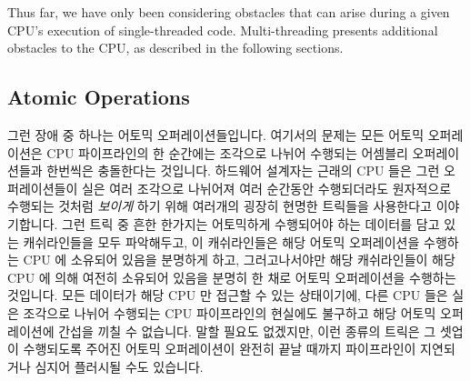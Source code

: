 Thus far, we have only been considering obstacles that can arise during
a given CPU's execution of single-threaded code.
Multi-threading presents additional obstacles to the CPU, as
described in the following sections.
\fi

\subsection{Atomic Operations}
\label{sec:cpu:Atomic Operations}

그런 장애 중 하나는 어토믹 오퍼레이션들입니다.
여기서의 문제는 모든 어토믹 오퍼레이션은 CPU 파이프라인의 한 순간에는 조각으로
나뉘어 수행되는 어셈블리 오퍼레이션들과 한번씩은 충돌한다는 것입니다.
하드웨어 설계자는 근래의 CPU 들은 그런 오퍼레이션들이 실은 여러 조각으로
나뉘어져 여러 순간동안 수행되더라도 원자적으로 수행되는 것처럼 \emph{보이게}
하기 위해 여러개의 굉장히 현명한 트릭들을 사용한다고 이야기합니다. 그런 트릭 중
흔한 한가지는 어토믹하게 수행되어야 하는 데이터를 담고 있는 캐쉬라인들을 모두
파악해두고, 이 캐쉬라인들은 해당 어토믹 오퍼레이션을 수행하는 CPU 에 소유되어
있음을 분명하게 하고, 그러고나서야만 해당 캐쉬라인들이 해당 CPU 에 의해 여전히
소유되어 있음을 분명히 한 채로 어토믹 오퍼레이션을 수행하는 것입니다.
모든 데이터가 해당 CPU 만 접근할 수 있는 상태이기에, 다른 CPU 들은 실은
조각으로 나뉘어 수행되는 CPU 파이프라인의 현실에도 불구하고 해당 어토믹
오퍼레이션에 간섭을 끼칠 수 없습니다.
말할 필요도 없겠지만, 이런 종류의 트릭은 그 셋업이 수행되도록 주어진 어토믹
오퍼레이션이 완전히 끝날 때까지 파이프라인이 지연되거나 심지어 플러시될 수도
있습니다.

